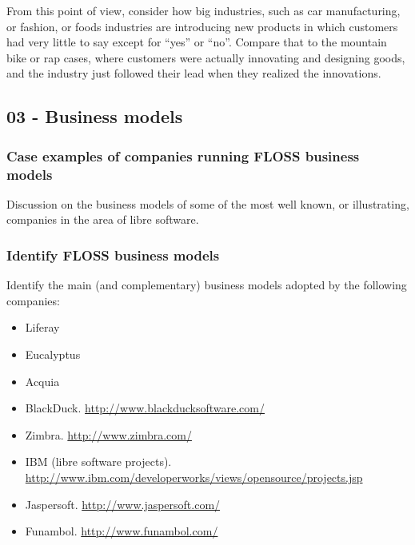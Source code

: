 \documentclass[a4paper]{article}
\begin{document}
From this point of view, consider how big industries, such as car manufacturing, or fashion, or foods industries are introducing new products in which customers had very little to say except for ``yes'' or ``no''. Compare that to the mountain bike or rap cases, where customers were actually innovating and designing goods, and the industry just followed their lead when they realized the innovations.
\subsection{03 - Business models}

\subsubsection{Case examples of companies running FLOSS business models}
\label{sub:business-cases}

Discussion on the business models of some of the most well known, or illustrating, companies in the area of libre software.

\subsubsection{Identify FLOSS business models}
\label{sub:business-models}

Identify the main (and complementary) business models adopted by the following companies:

\begin{itemize}
\item Liferay
\item Eucalyptus
\item Acquia
\item BlackDuck.
   \url{http://www.blackducksoftware.com/}
 \item Zimbra.
   \url{http://www.zimbra.com/}
 \item IBM (libre software projects).
   \footnotesize{\url{http://www.ibm.com/developerworks/views/opensource/projects.jsp}}
 \item Jaspersoft.
   \url{http://www.jaspersoft.com/}
 \item Funambol.
   \url{http://www.funambol.com/}
\end{itemize}
\end{document}
